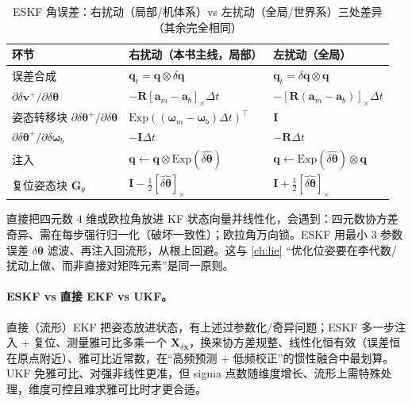 \begin{table}[ht]\centering\small
\caption{ESKF 角误差：右扰动（局部/机体系）vs 左扰动（全局/世界系）三处差异（其余完全相同）}
\label{tab:eskf-pert}
\begin{tabular}{lll}
\toprule
环节 & 右扰动（本书主线，局部） & 左扰动（全局） \\
\midrule
误差合成 & $\mathbf{q}_t=\mathbf{q}\otimes\delta\mathbf{q}$ & $\mathbf{q}_t=\delta\mathbf{q}\otimes\mathbf{q}$ \\
$\partial\delta\mathbf{v}^+/\partial\delta\boldsymbol{\theta}$ & $-\mathbf{R}[\mathbf{a}_m-\mathbf{a}_b]_\times\Delta t$ & $-[\mathbf{R}(\mathbf{a}_m-\mathbf{a}_b)]_\times\Delta t$ \\
姿态转移块 $\partial\delta\boldsymbol{\theta}^+/\partial\delta\boldsymbol{\theta}$ & $\mathrm{Exp}((\boldsymbol{\omega}_m-\boldsymbol{\omega}_b)\Delta t)^\top$ & $\mathbf{I}$ \\
$\partial\delta\boldsymbol{\theta}^+/\partial\delta\boldsymbol{\omega}_b$ & $-\mathbf{I}\Delta t$ & $-\mathbf{R}\Delta t$ \\
注入 & $\mathbf{q}\leftarrow\mathbf{q}\otimes\mathrm{Exp}(\widehat{\delta\boldsymbol{\theta}})$ & $\mathbf{q}\leftarrow\mathrm{Exp}(\widehat{\delta\boldsymbol{\theta}})\otimes\mathbf{q}$ \\
复位姿态块 $\mathbf{G}_{\theta}$ & $\mathbf{I}-\tfrac12[\widehat{\delta\boldsymbol{\theta}}]_\times$ & $\mathbf{I}+\tfrac12[\widehat{\delta\boldsymbol{\theta}}]_\times$ \\
\bottomrule
\end{tabular}
\end{table}

\begin{pitfall}
直接把四元数 $4$ 维或欧拉角放进 KF 状态向量并线性化，会遇到：四元数协方差奇异、需在每步强行归一化（破坏一致性）；欧拉角万向锁。ESKF 用最小 $3$ 参数误差 $\delta\boldsymbol{\theta}$ 滤波、再注入回流形，从根上回避。这与 \cref{ch:lie} “优化位姿要在李代数/扰动上做、而非直接对矩阵元素”是同一原则。
\end{pitfall}

\paragraph{ESKF vs 直接 EKF vs UKF。}
直接（流形）EKF 把姿态放进状态，有上述过参数化/奇异问题；ESKF 多一步注入 $+$ 复位、测量雅可比多乘一个 $\mathbf{X}_{\delta\mathbf{x}}$，换来协方差规整、线性化恒有效（误差恒在原点附近）、雅可比近常数，在“高频预测 $+$ 低频校正”的惯性融合中最划算。UKF 免雅可比、对强非线性更准，但 sigma 点数随维度增长、流形上需特殊处理，维度可控且难求雅可比时才更合适。

